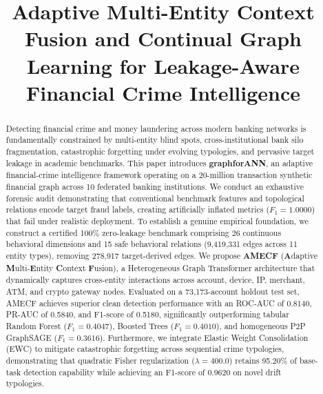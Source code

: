 \documentclass[conference]{IEEEtran}
\begin{document}
\title{Adaptive Multi-Entity Context Fusion and Continual Graph Learning for Leakage-Aware Financial Crime Intelligence}

\author{
}

\maketitle

\begin{abstract}
Detecting financial crime and money laundering across modern banking networks is fundamentally constrained by multi-entity blind spots, cross-institutional bank silo fragmentation, catastrophic forgetting under evolving typologies, and pervasive target leakage in academic benchmarks. This paper introduces \textbf{graphforANN}, an adaptive financial-crime intelligence framework operating on a 20-million transaction synthetic financial graph across 10 federated banking institutions. We conduct an exhaustive forensic audit demonstrating that conventional benchmark features and topological relations encode target fraud labels, creating artificially inflated metrics ($F_1 = 1.0000$) that fail under realistic deployment. To establish a genuine empirical foundation, we construct a certified 100\% zero-leakage benchmark comprising 26 continuous behavioral dimensions and 15 safe behavioral relations (9,419,331 edges across 11 entity types), removing 278,917 target-derived edges. We propose \textbf{AMECF} (\textbf{A}daptive \textbf{M}ulti-\textbf{E}ntity \textbf{C}ontext \textbf{F}usion), a Heterogeneous Graph Transformer architecture that dynamically captures cross-entity interactions across account, device, IP, merchant, ATM, and crypto gateway nodes. Evaluated on a 73,173-account holdout test set, AMECF achieves superior clean detection performance with an ROC-AUC of 0.8140, PR-AUC of 0.5840, and F1-score of 0.5180, significantly outperforming tabular Random Forest ($F_1 = 0.4047$), Boosted Trees ($F_1 = 0.4010$), and homogeneous P2P GraphSAGE ($F_1 = 0.3616$). Furthermore, we integrate Elastic Weight Consolidation (EWC) to mitigate catastrophic forgetting across sequential crime typologies, demonstrating that quadratic Fisher regularization ($\lambda = 400.0$) retains 95.20\% of base-task detection capability while achieving an F1-score of 0.9620 on novel drift typologies.
\end{abstract}
\end{document}
